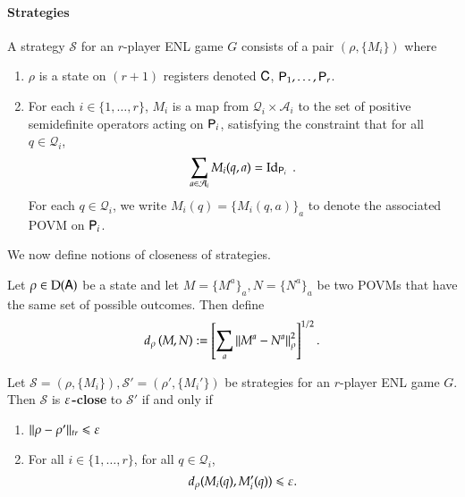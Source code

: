 \paragraph{Strategies}

A strategy $\mathcal{S}$ for an $r$-player ENL game $G$ consists of a pair $(\rho,\{M_i\})$ where
\begin{enumerate}
	\item $\rho$ is a state on $(r+1)$ registers denoted ${\mathsf{C}}$, ${\mathsf{P}}_1,\ldots, {\mathsf{P}}_r$.
	\item For each $i\in\{1,\ldots,r\}$, $M_i$ is a map from $\mathcal{Q}_i \times \mathcal{A}_i$ to the set of positive semidefinite operators acting on ${\mathsf{P}}_i$, satisfying the constraint that for all $q \in \mathcal{Q}_i$,
	\[
		\sum_{a \in \mathcal{A}_i} M_i(q,a) = \mathop{\mathrm{Id}}\!\mathinner{}_{{\mathsf{P}}_i}\;.
	\]
	For each $q \in \mathcal{Q}_i$, we write $M_i(q) = \{M_i(q,a)\}_a$ to denote the associated POVM on ${\mathsf{P}}_i$.
\end{enumerate}


We now define notions of closeness of strategies. 

\begin{definition}
	Let $\rho \in \mathrm{D}({\mathsf{A}})$ be a state and let $M = \{M^a\}_a,N = \{N^a\}_a$ be two POVMs that have the same set of possible outcomes. Then define 
	\begin{align}
		d_\rho \left( M, N \right) := \left[ \sum_a \left\lVert M^a - N^a \right\rVert_\rho^2 \right]^{1/2}.
	\end{align}
\end{definition}


\begin{definition}
	Let $\mathcal{S} = (\rho,\{M_i\}), \mathcal{S}' = (\rho',\{M_i'\})$ be strategies for an $r$-player ENL game $G$. Then $\mathcal{S}$ is \textbf{$\varepsilon$-close} to $\mathcal{S}'$ if and only if
	\begin{enumerate}
		\item $ \lVert \rho - \rho'\rVert_{tr} \leqslant \varepsilon$
		\item For all $i\in\{1,\ldots,r\}$, for all $q \in \mathcal{Q}_i$,
		\[
		d_\rho(M_i(q),M_i'(q)) \leqslant \varepsilon.
		\]
	\end{enumerate}
\end{definition}

